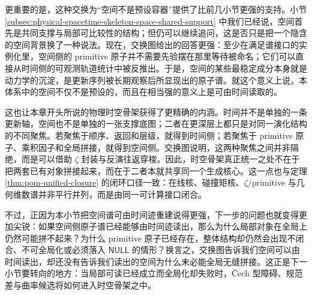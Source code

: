 更重要的是，这种交换为“空间不是预设容器”提供了比前几小节更强的支持。小节 \ref{subsec:physical-spacetime-skeleton-space-shared-support} 中我们已经说，空间首先是共同支撑与局部可比较性的结构；但仍可以继续追问，这是否只是把一个隐含的空间背景换了一种说法。现在，交换图给出的回答更强：至少在满足谱接口的实例化里，空间侧的 primitive 原子并不需要先验摆在那里等待被命名；它们可以直接从时间侧的可观测轨道统计中被反推出。于是，空间的某些最稳定成分本身就是动力学的沉淀，是更新序列被长期观察后所显现出的原子谱。就这个意义上说，本体系中的空间不仅不是预设的，而且在相当强的意义上是可由时间读取的。

这也让本章开头所说的物理时空骨架获得了更精确的内涵。时间并不是单独的一条更新轴，空间也不是单独的一张支撑底图；二者在更深层上都只是对同一演化结构的不同聚焦。若聚焦于顺序、返回和层级，就得到时间侧；若聚焦于 primitive 原子、乘积因子和全局拼接，就得到空间侧。交换图说明，这两种聚焦之间并非隔绝，而是可以借助 \(\zeta\) 封装与反演往返穿梭。因此，时空骨架真正统一之处不在于把两套已有对象拼接起来，而在于二者本就共享同一个生成核心。这一点也与定理 \ref{thm:pom-unified-closure} 的闭环口径一致：在线核、碰撞矩核、\(\zeta\)/primitive 与几何维数谱并非平行并列，而是由同一可计算接口闭合。

不过，正因为本小节把空间谱可由时间迹重建说得更强，下一步的问题也就变得更加尖锐：如果空间侧原子谱已经能够由时间迹读出，那么为什么局部对象在全局上仍然可能拼不起来？为什么 primitive 原子已经存在，整体结构却仍然会出现不闭合、不可全局化或必须落入 \(\mathsf{NULL}\) 的情形？换言之，交换图告诉我们空间可以由时间读出，却还没有告诉我们读出的空间为什么未必能全局无缝拼接。这正是下一小节要转向的地方：当局部可读已经成立而全局化却失败时，Čech 型障碍、规范差与曲率候选将如何进入时空骨架之中。
